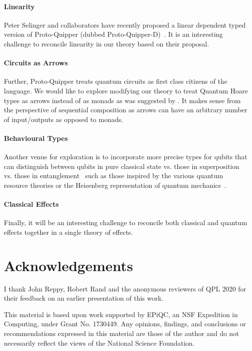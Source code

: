 \documentclass[adraft,creativecommons]{eptcs}
\theoremstyle{definition}
\theoremstyle{remark}
\begin{document}
\paragraph{Linearity} Peter Selinger and collaborators have recently proposed a linear dependent typed version of Proto-Quipper (dubbed Proto-Quipper-D)~\cite{selinger2020,fu2020linear}. It is an interesting challenge to reconcile linearity in our theory based on their proposal.

\paragraph{Circuits as Arrows} Further, Proto-Quipper treats quantum circuits as first class citizens of the language. We would like to explore modifying our theory to treat Quantum Hoare types as arrows instead of as monads as was suggested by \cite{so-arrows}. It makes sense from the perspective of sequential composition as arrows can have an arbitrary number of input/outputs as opposed to monads.

\paragraph{Behavioural Types} Another venue for exploration is to incorporate more precise types for qubits that can distinguish between qubits in pure classical state vs. those in superposition vs. those in entanglement~\cite{JorrandPerdrix2009} such as those inspired by the various quantum resource theories or the Heisenberg representation of quantum mechanics~\cite{rssl2019,rssl20}.

\paragraph{Classical Effects} Finally, it will be an interesting challenge to reconcile both classical and quantum effects together in a single theory of effects.

\section*{Acknowledgements}
I thank John Reppy, Robert Rand and the anonymous reviewers of QPL 2020 for their feedback on an earlier presentation of this work.

This material is based upon work supported by EPiQC, an NSF Expedition in Computing, under Grant No. 1730449. Any opinions, findings, and conclusions or recommendations expressed in this material are those
of the author and do not necessarily reflect the views of the National Science Foundation.
\end{document}
